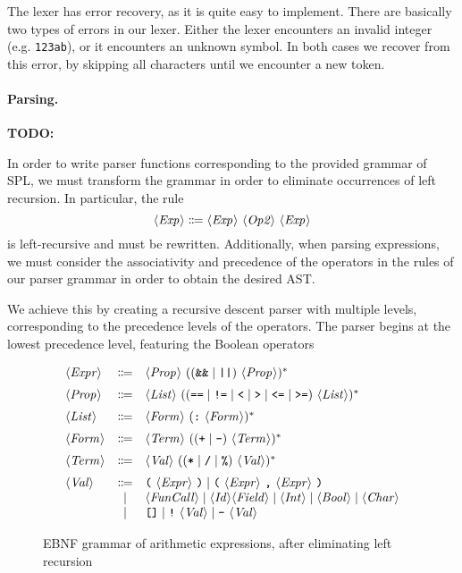 \documentclass{report}
\begin{document}
The lexer has error recovery, as it is quite easy to implement.
There are basically two types of errors in our lexer.
Either the lexer encounters an invalid integer (e.g. \verb|123ab|),
or it encounters an unknown symbol.
In both cases we recover from this error, by skipping all characters until we
encounter a new token.

\paragraph{Parsing.}
\textbf{TODO:}

In order to write parser functions corresponding to the provided grammar of SPL,
we must transform the grammar in order to eliminate occurrences of left
recursion.
In particular, the rule
\[ \langle \textit{Exp}\kern.7pt \rangle \Coloneqq \langle \textit{Exp}\kern.7pt \rangle\ \langle \textit{Op2}\kern.7pt \rangle\ \langle \textit{Exp}\kern.7pt \rangle \]
is left-recursive and must be rewritten.
Additionally, when parsing expressions, we must consider the associativity and
precedence of the operators in the rules of our parser grammar in order to
obtain the desired AST.

We achieve this by creating a recursive descent parser with multiple levels,
corresponding to the precedence levels of the operators. The parser begins at
the lowest precedence level, featuring the Boolean operators


\begin{figure}[ht]
  \[
  \begin{array}{lcl}
		\NT{Expr} & \Coloneqq & \NT{Prop}\ ((\code{\&\&} \mid \code{||})\ \NT{Prop})^* \br
		\NT{Prop} & \Coloneqq & \NT{List}\ ((\code{==} \mid \code{!=} \mid \code{<} \mid \code{>} \mid \code{<=} \mid \code{>=})\ \NT{List})^* \br
		\NT{List} & \Coloneqq & \NT{Form}\ (\code{:}\ \NT{Form})^* \br
		\NT{Form} & \Coloneqq & \NT{Term}\ (( \code{+} \mid \code{-} )\ \NT{Term})^* \br
		\NT{Term} & \Coloneqq & \NT{Val}\ (( \code{*} \mid \code{/} \mid \code{\%} )\ \NT{Val} )^* \br
		\NT{Val} & \Coloneqq & \code{(}\ \NT{Expr}\ \code{)} \mid \code{(}\ \NT{Expr}\ \code{,}\ \NT{Expr}\ \code{)} \\
		& \mid & \NT{FunCall} \mid \NT{Id} \NT{Field} \mid \NT{Int} \mid \NT{Bool} \mid \NT{Char} \\
		& \mid & \code{[]} \mid \code{!}\ \NT{Val} \mid \code{-}\ \NT{Val}
  \end{array}
  \]
  \caption{EBNF grammar of arithmetic expressions, after eliminating left recursion}
  \label{fig:refactored-grammar}
\end{figure}
\end{document}
